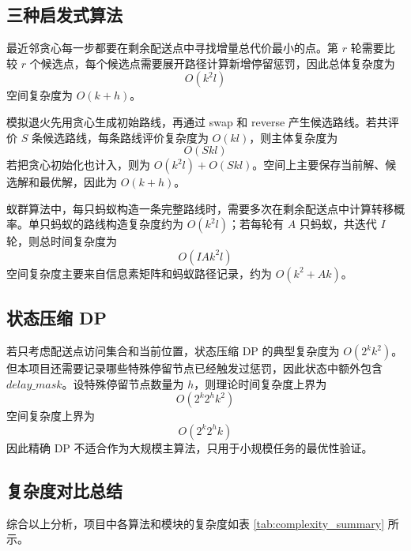 \documentclass[12pt,a4paper,UTF8]{article}
\begin{document}
\subsection{三种启发式算法}

最近邻贪心每一步都要在剩余配送点中寻找增量总代价最小的点。第 $r$ 轮需要比较 $r$ 个候选点，每个候选点需要展开路径计算新增停留惩罚，因此总体复杂度为
\[
    O(k^2l)
\]
空间复杂度为 $O(k+h)$。

模拟退火先用贪心生成初始路线，再通过 swap 和 reverse 产生候选路线。若共评价 $S$ 条候选路线，每条路线评价复杂度为 $O(kl)$，则主体复杂度为
\[
    O(Skl)
\]
若把贪心初始化也计入，则为 $O(k^2l)+O(Skl)$。空间上主要保存当前解、候选解和最优解，因此为 $O(k+h)$。

蚁群算法中，每只蚂蚁构造一条完整路线时，需要多次在剩余配送点中计算转移概率。单只蚂蚁的路线构造复杂度约为 $O(k^2l)$；若每轮有 $A$ 只蚂蚁，共迭代 $I$ 轮，则总时间复杂度为
\[
    O(IAk^2l)
\]
空间复杂度主要来自信息素矩阵和蚂蚁路径记录，约为 $O(k^2+Ak)$。

\subsection{状态压缩 DP}

若只考虑配送点访问集合和当前位置，状态压缩 DP 的典型复杂度为 $O(2^k k^2)$。但本项目还需要记录哪些特殊停留节点已经触发过惩罚，因此状态中额外包含 $delay\_mask$。设特殊停留节点数量为 $h$，则理论时间复杂度上界为
\[
    O(2^k2^hk^2)
\]
空间复杂度上界为
\[
    O(2^k2^hk)
\]
因此精确 DP 不适合作为大规模主算法，只用于小规模任务的最优性验证。

\subsection{复杂度对比总结}

综合以上分析，项目中各算法和模块的复杂度如表 \ref{tab:complexity_summary} 所示。
\end{document}
